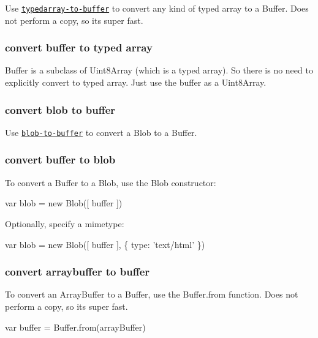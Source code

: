 Use \href{https://www.npmjs.com/package/typedarray-to-buffer}{\tt {\ttfamily typedarray-\/to-\/buffer}} to convert any kind of typed array to a {\ttfamily Buffer}. Does not perform a copy, so it\textquotesingle{}s super fast.

\subsubsection*{convert buffer to typed array}

{\ttfamily Buffer} is a subclass of {\ttfamily Uint8\+Array} (which is a typed array). So there is no need to explicitly convert to typed array. Just use the buffer as a {\ttfamily Uint8\+Array}.

\subsubsection*{convert blob to buffer}

Use \href{https://www.npmjs.com/package/blob-to-buffer}{\tt {\ttfamily blob-\/to-\/buffer}} to convert a {\ttfamily Blob} to a {\ttfamily Buffer}.

\subsubsection*{convert buffer to blob}

To convert a {\ttfamily Buffer} to a {\ttfamily Blob}, use the {\ttfamily Blob} constructor\+:


\begin{DoxyCode}
var blob = new Blob([ buffer ])
\end{DoxyCode}


Optionally, specify a mimetype\+:


\begin{DoxyCode}
var blob = new Blob([ buffer ], \{ type: 'text/html' \})
\end{DoxyCode}


\subsubsection*{convert arraybuffer to buffer}

To convert an {\ttfamily Array\+Buffer} to a {\ttfamily Buffer}, use the {\ttfamily Buffer.\+from} function. Does not perform a copy, so it\textquotesingle{}s super fast.


\begin{DoxyCode}
var buffer = Buffer.from(arrayBuffer)
\end{DoxyCode}


